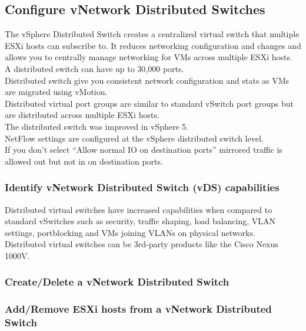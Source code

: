\subsection{Configure vNetwork Distributed Switches}

The vSphere Distributed Switch creates a centralized virtual switch that
multiple ESXi hosts can subscribe to. It reduces networking configuration and
changes and allows you to centrally manage networking for VMs across multiple
ESXi hosts.\\

A distributed switch can have up to 30,000 ports.\\

Distributed switch give you consistent network configuration and stats as
VMs are migrated using vMotion.\\

Distributed virtual port groups are similar to standard vSwitch port groups
but are distributed across multiple ESXi hosts.\\

The distributed switch was improved in vSphere 5.\\

NetFlow settings are configured at the vSphere distributed switch level.\\

If you don't select ``Allow normal IO on destination ports'' mirrored traffic
is allowed out but not in on destination ports.

\subsubsection{Identify vNetwork Distributed Switch (vDS) capabilities}

Distributed virtual switches have increased capabilities when compared to
standard vSwitches such as security, traffic shaping, load balancing, VLAN
settings, portblocking and VMs joining VLANs on physical networks.\\

Distributed virtual switches can be 3rd-party products like the Cisco Nexus
1000V.

\subsubsection{Create/Delete a vNetwork Distributed Switch}

\subsubsection{Add/Remove ESXi hosts from a vNetwork Distributed Switch}

